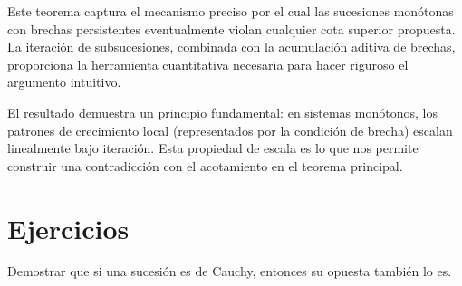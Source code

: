 Este teorema captura el mecanismo preciso por el cual las sucesiones
monótonas con brechas persistentes eventualmente violan cualquier cota
superior propuesta. La iteración de subsucesiones, combinada con la
acumulación aditiva de brechas, proporciona la herramienta cuantitativa
necesaria para hacer riguroso el argumento intuitivo.

El resultado demuestra un principio fundamental: en sistemas monótonos,
los patrones de crecimiento local (representados por la condición de
brecha) escalan linealmente bajo iteración. Esta propiedad de escala es
lo que nos permite construir una contradicción con el acotamiento en el
teorema principal.

\section{Ejercicios}

\begin{ejercicio}
  Demostrar que si una sucesión es de Cauchy, entonces su opuesta
  también lo es.
\end{ejercicio}

